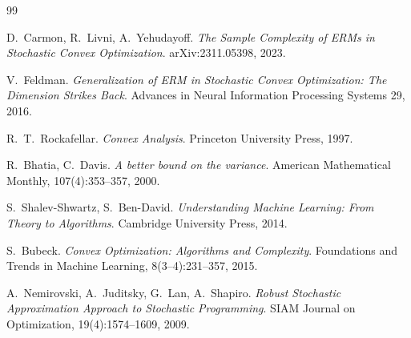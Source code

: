 \documentclass[12pt,a4paper]{article}
\theoremstyle{plain}
\theoremstyle{definition}
\begin{document}
\begin{thebibliography}{99}

D.~Carmon, R.~Livni, A.~Yehudayoff.
\emph{The Sample Complexity of ERMs in Stochastic Convex Optimization}.
arXiv:2311.05398, 2023.

V.~Feldman.
\emph{Generalization of ERM in Stochastic Convex Optimization: The Dimension Strikes Back}.
Advances in Neural Information Processing Systems 29, 2016.

R.~T.~Rockafellar.
\emph{Convex Analysis}.
Princeton University Press, 1997.

R.~Bhatia, C.~Davis.
\emph{A better bound on the variance}.
American Mathematical Monthly, 107(4):353--357, 2000.

S.~Shalev-Shwartz, S.~Ben-David.
\emph{Understanding Machine Learning: From Theory to Algorithms}.
Cambridge University Press, 2014.

S.~Bubeck.
\emph{Convex Optimization: Algorithms and Complexity}.
Foundations and Trends in Machine Learning, 8(3--4):231--357, 2015.

A.~Nemirovski, A.~Juditsky, G.~Lan, A.~Shapiro.
\emph{Robust Stochastic Approximation Approach to Stochastic Programming}.
SIAM Journal on Optimization, 19(4):1574--1609, 2009.

\end{thebibliography}
\end{document}
